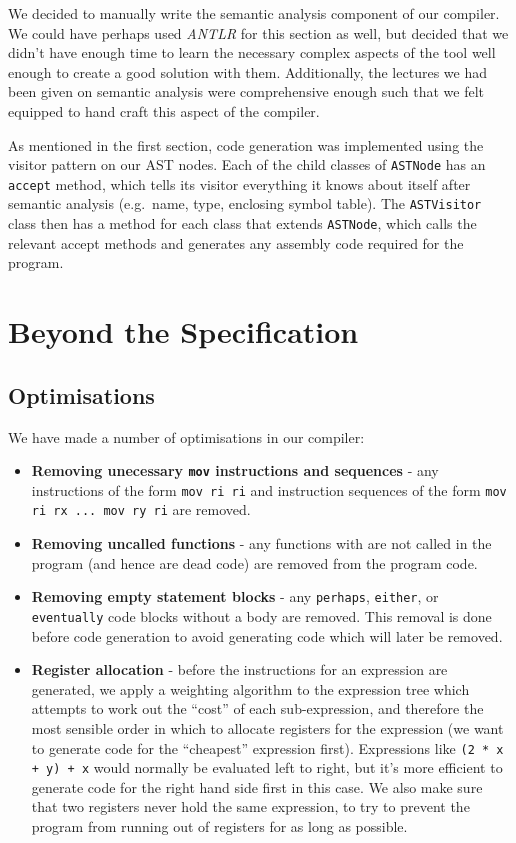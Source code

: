 \documentclass[11pt, notitlepage]{report}
\begin{document}
We decided to manually write the semantic analysis component of our compiler. We could have perhaps used \emph{ANTLR} for this section as well, but decided that we didn't have enough time to learn the necessary complex aspects of the tool well enough to create a good solution with them. Additionally, the lectures we had been given on semantic analysis were comprehensive enough such that we felt equipped to hand craft this aspect of the compiler.

As mentioned in the first section, code generation was implemented using the visitor pattern on our AST nodes. Each of the child classes of \texttt{ASTNode} has an \texttt{accept} method, which tells its visitor everything it knows about itself after semantic analysis (e.g.\ name, type, enclosing symbol table). The \texttt{ASTVisitor} class then has a method for each class that extends \texttt{ASTNode}, which calls the relevant accept methods and generates any assembly code required for the program.

\section*{Beyond the Specification}
\subsection*{Optimisations}
We have made a number of optimisations in our compiler:
\begin{itemize}
\item \textbf{Removing unecessary \texttt{mov} instructions and sequences} - any instructions of the form \texttt{mov ri ri} and instruction sequences of the form \texttt{mov ri rx ... mov ry ri} are removed.
\item \textbf{Removing uncalled functions} - any functions with are not called in the program (and hence are dead code) are removed from the program code.
\item \textbf{Removing empty statement blocks} - any \texttt{perhaps}, \texttt{either}, or \texttt{eventually} code blocks without a body are removed. This removal is done before code generation to avoid generating code which will later be removed.
\item \textbf{Register allocation} - before the instructions for an expression are generated, we apply a weighting algorithm to the expression tree which attempts to work out the ``cost'' of each sub-expression, and therefore the most sensible order in which to allocate registers for the expression (we want to generate code for the ``cheapest'' expression first). Expressions like \texttt{(2 * x + y) + x} would normally be evaluated left to right, but it's more efficient to generate code for the right hand side first in this case. We also make sure that two registers never hold the same expression, to try to prevent the program from running out of registers for as long as possible.
\end{itemize}
\end{document}
